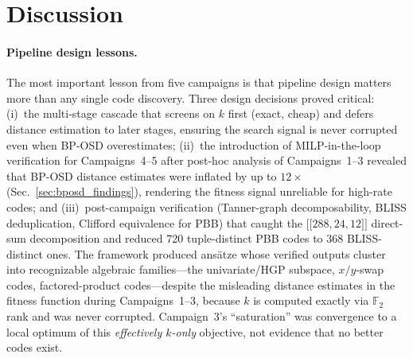 \documentclass[aps,prxquantum,twocolumn,superscriptaddress,nofootinbib]{revtex4-2}
\newcommand{\FF}{\ensuremath{\mathbb{F}}}
\newcommand{\dblbrk}[1]{\ensuremath{\lbrack\!\lbrack #1 \rbrack\!\rbrack}}
\newcommand{\code}[1]{\dblbrk{#1}}
\begin{document}
\section{Discussion}
\label{sec:discussion}

\paragraph{Pipeline design lessons.} 
The most important lesson from five campaigns is that pipeline design matters more than any single code discovery.
Three design decisions proved critical:
(i)~the multi-stage cascade that screens on $k$ first (exact, cheap) and defers distance estimation to later stages, ensuring the search signal is never corrupted even when BP-OSD overestimates;
(ii)~the introduction of MILP-in-the-loop verification for Campaigns~4--5 after post-hoc analysis of Campaigns~1--3 revealed that BP-OSD distance estimates were inflated by up to $12\times$ (Sec.~\ref{sec:bposd_findings}), rendering the fitness signal unreliable for high-rate codes;
and (iii)~post-campaign verification (Tanner-graph decomposability, BLISS deduplication, Clifford equivalence for PBB) that caught the $\code{288,24,12}$ direct-sum decomposition and reduced 720 tuple-distinct PBB codes to 368 BLISS-distinct ones.
The framework produced ansätze whose verified outputs cluster into recognizable algebraic families---the univariate/HGP subspace, $x/y$-swap codes, factored-product codes---despite the misleading distance estimates in the fitness function during Campaigns~1--3, because $k$ is computed exactly via $\FF_2$ rank and was never corrupted.
Campaign~3's ``saturation'' was convergence to a local optimum of this \emph{effectively $k$-only} objective, not evidence that no better codes exist.
\end{document}
